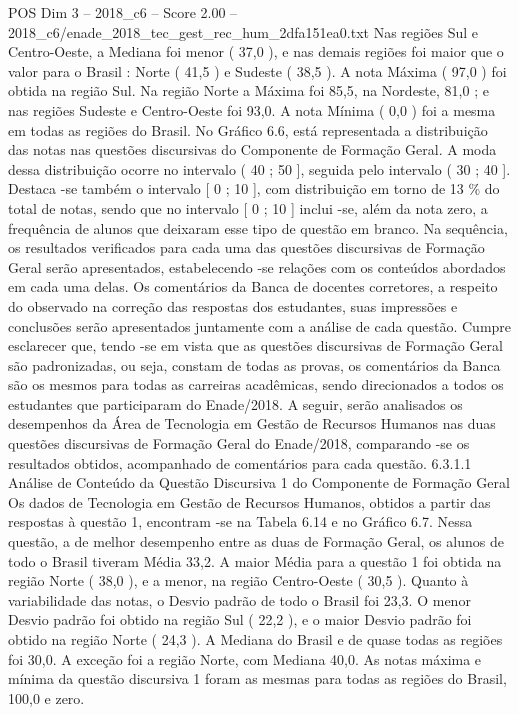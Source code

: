 \begin{textsample}{POS Dim 3 – 2018\_c6 – Score 2.00 – 2018\_c6/enade\_2018\_tec\_gest\_rec\_hum\_2dfa151ea0.txt}
Nas regiões Sul e Centro-Oeste, a Mediana foi menor ( 37,0 ), e nas demais regiões foi maior que o valor para o Brasil : Norte ( 41,5 ) e Sudeste ( 38,5 ).
A nota Máxima ( 97,0 ) foi obtida na região Sul.
Na região Norte a Máxima foi 85,5, na Nordeste, 81,0 ; e nas regiões Sudeste e Centro-Oeste foi 93,0.
A nota Mínima ( 0,0 ) foi a mesma em todas as regiões do Brasil.
No Gráfico 6.6, está representada a distribuição das notas nas questões discursivas do Componente de Formação Geral.
A moda dessa distribuição ocorre no intervalo ( 40 ; 50 ], seguida pelo intervalo ( 30 ; 40 ].
Destaca -se também o intervalo [ 0 ; 10 ], com distribuição em torno de 13 \% do total de notas, sendo que no intervalo [ 0 ; 10 ] inclui -se, além da nota zero, a frequência de alunos que deixaram esse tipo de questão em branco.
Na sequência, os resultados verificados para cada uma das questões discursivas de Formação Geral serão apresentados, estabelecendo -se relações com os conteúdos abordados em cada uma delas.
Os comentários da Banca de docentes corretores, a respeito do observado na correção das respostas dos estudantes, suas impressões e conclusões serão apresentados juntamente com a análise de cada questão.
Cumpre esclarecer que, tendo -se em vista que as questões discursivas de Formação Geral são padronizadas, ou seja, constam de todas as provas, os comentários da Banca são os mesmos para todas as carreiras acadêmicas, sendo direcionados a todos os estudantes que participaram do Enade/2018.
A seguir, serão analisados os desempenhos da Área de Tecnologia em Gestão de Recursos Humanos nas duas questões discursivas de Formação Geral do Enade/2018, comparando -se os resultados obtidos, acompanhado de comentários para cada questão. 6.3.1.1 Análise de Conteúdo da Questão Discursiva 1 do Componente de Formação Geral Os dados de Tecnologia em Gestão de Recursos Humanos, obtidos a partir das respostas à questão 1, encontram -se na Tabela 6.14 e no Gráfico 6.7.
Nessa questão, a de melhor desempenho entre as duas de Formação Geral, os alunos de todo o Brasil tiveram Média 33,2.
A maior Média para a questão 1 foi obtida na região Norte ( 38,0 ), e a menor, na região Centro-Oeste ( 30,5 ).
Quanto à variabilidade das notas, o Desvio padrão de todo o Brasil foi 23,3.
O menor Desvio padrão foi obtido na região Sul ( 22,2 ), e o maior Desvio padrão foi obtido na região Norte ( 24,3 ).
A Mediana do Brasil e de quase todas as regiões foi 30,0.
A exceção foi a região Norte, com Mediana 40,0.
As notas máxima e mínima da questão discursiva 1 foram as mesmas para todas as regiões do Brasil, 100,0 e zero.

\end{textsample}
